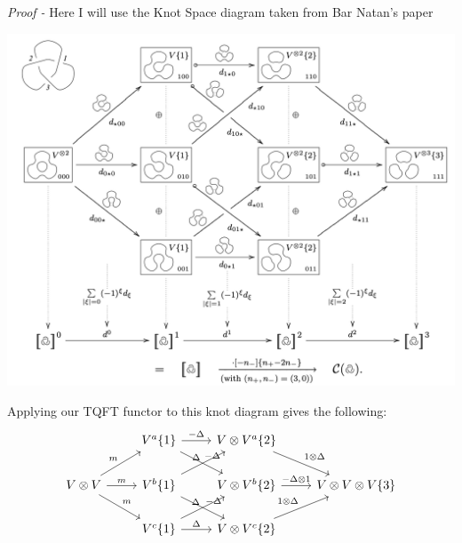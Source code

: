 \documentclass[11pt]{article}
\theoremstyle{definition}
\newcommand{\set}[1]{\{#1\}}
\begin{document}
    \emph{Proof - } Here I will use the Knot Space diagram taken from Bar Natan's paper
    \begin{center}
        \includegraphics[width=\textwidth]{additional pdfs/Trefoil knot diagram.png}
    \end{center}

    Applying our TQFT functor to this knot diagram gives the following:
    \begin{equation*}
        \begin{tikzcd}
            &V^a\set{1} \arrow[r,"{-\Delta}"] \arrow[rd,"{-\Delta}"] &V\otimes V^a\set{2} \arrow[rd,"{1 \otimes \Delta}"] \\
            V\otimes V \arrow[ru,"{m}"] \arrow[r,"{m}"] \arrow[rd,"{m}"] &V^b\set{1} \arrow[ru,"{\Delta}"] \arrow[rd,"{-\Delta}"] &V\otimes V^b\set{2} \arrow[r,"{-\Delta \otimes 1}"] &V\otimes V\otimes V\set{3} \\
            &V^c\set{1} \arrow[ru,"{\Delta}"] \arrow[r,"{\Delta}"] &V\otimes V^c\set{2} \arrow[ru,"{1 \otimes\Delta}"]
        \end{tikzcd}
    \end{equation*}
\end{document}
